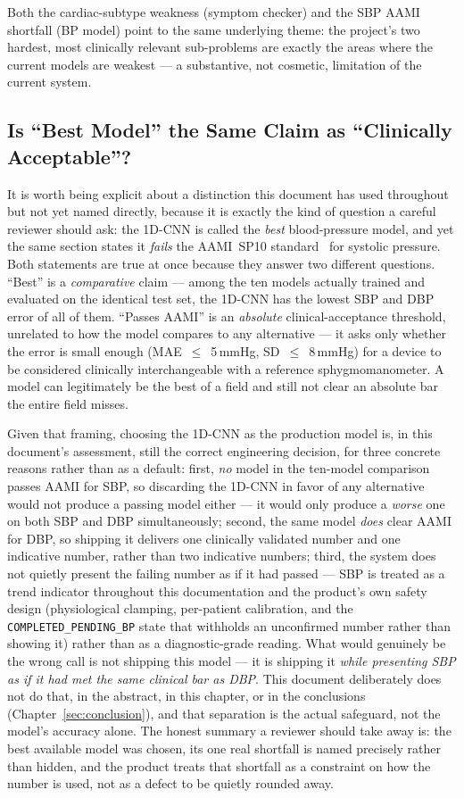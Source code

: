 \documentclass[12pt,a4paper]{report}
\begin{document}
Both the cardiac-subtype weakness (symptom checker) and the SBP AAMI shortfall
(BP model) point to the same underlying theme: the project's two hardest, most
clinically relevant sub-problems are exactly the areas where the current models
are weakest --- a substantive, not cosmetic, limitation of the current system.

\subsection*{Is ``Best Model'' the Same Claim as ``Clinically Acceptable''? }

It is worth being explicit about a distinction this document has used
throughout but not yet named directly, because it is exactly the kind of
question a careful reviewer should ask: the 1D-CNN is called the \emph{best}
blood-pressure model, and yet the same section states it \emph{fails} the
AAMI~SP10 standard~\cite{aami} for systolic pressure. Both statements are true
at once because they answer two different questions. ``Best'' is a
\emph{comparative} claim --- among the ten models actually trained and
evaluated on the identical test set, the 1D-CNN has the lowest SBP and DBP
error of all of them. ``Passes AAMI'' is an \emph{absolute} clinical-acceptance
threshold, unrelated to how the model compares to any alternative --- it asks
only whether the error is small enough (MAE~$\le$~5\,mmHg, SD~$\le$~8\,mmHg) for
a device to be considered clinically interchangeable with a reference
sphygmomanometer. A model can legitimately be the best of a field and still not
clear an absolute bar the entire field misses.

Given that framing, choosing the 1D-CNN as the production model is, in this
document's assessment, still the correct engineering decision, for three
concrete reasons rather than as a default: first, \emph{no} model in the
ten-model comparison passes AAMI for SBP, so discarding the 1D-CNN in favor of
any alternative would not produce a passing model either --- it would only
produce a \emph{worse} one on both SBP and DBP simultaneously; second, the same
model \emph{does} clear AAMI for DBP, so shipping it delivers one clinically
validated number and one indicative number, rather than two indicative
numbers; third, the system does not quietly present the failing number as if
it had passed --- SBP is treated as a trend indicator throughout this
documentation and the product's own safety design (physiological clamping,
per-patient calibration, and the \texttt{COMPLETED\_PENDING\_BP} state that
withholds an unconfirmed number rather than showing it) rather than as a
diagnostic-grade reading. What would genuinely be the wrong call is not
shipping this model --- it is shipping it \emph{while presenting SBP as if it
had met the same clinical bar as DBP}. This document deliberately does not do
that, in the abstract, in this chapter, or in the conclusions
(Chapter~\ref{sec:conclusion}), and that separation is the actual safeguard,
not the model's accuracy alone. The honest summary a reviewer should take away
is: the best available model was chosen, its one real shortfall is named
precisely rather than hidden, and the product treats that shortfall as a
constraint on how the number is used, not as a defect to be quietly rounded
away.
\end{document}

